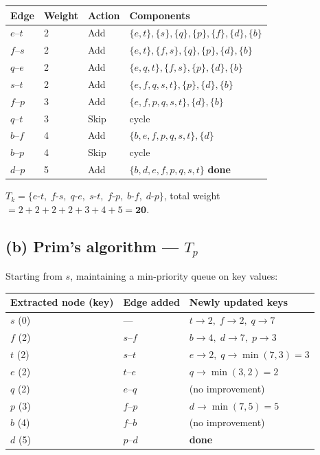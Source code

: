 \documentclass[11pt]{article}
\begin{document}
\begin{center}
\begin{tabular}{llll}
\toprule
Edge & Weight & Action & Components \\
\midrule
$e$--$t$ & 2 & Add & $\{e,t\},\{s\},\{q\},\{p\},\{f\},\{d\},\{b\}$ \\
$f$--$s$ & 2 & Add & $\{e,t\},\{f,s\},\{q\},\{p\},\{d\},\{b\}$ \\
$q$--$e$ & 2 & Add & $\{e,q,t\},\{f,s\},\{p\},\{d\},\{b\}$ \\
$s$--$t$ & 2 & Add & $\{e,f,q,s,t\},\{p\},\{d\},\{b\}$ \\
$f$--$p$ & 3 & Add & $\{e,f,p,q,s,t\},\{d\},\{b\}$ \\
$q$--$t$ & 3 & Skip & cycle \\
$b$--$f$ & 4 & Add & $\{b,e,f,p,q,s,t\},\{d\}$ \\
$b$--$p$ & 4 & Skip & cycle \\
$d$--$p$ & 5 & Add & $\{b,d,e,f,p,q,s,t\}$ \quad \textbf{done} \\
\bottomrule
\end{tabular}
\end{center}

$T_k = \{e\text{-}t,\; f\text{-}s,\; q\text{-}e,\; s\text{-}t,\; f\text{-}p,\; b\text{-}f,\; d\text{-}p\}$, \quad total weight $= 2+2+2+2+3+4+5 = \mathbf{20}$.

\subsection*{(b) Prim's algorithm --- $T_p$}

Starting from $s$, maintaining a min-priority queue on key values:

\begin{center}
\begin{tabular}{lll}
\toprule
Extracted node (key) & Edge added & Newly updated keys \\
\midrule
$s$ (0) & --- & $t{\to}2,\; f{\to}2,\; q{\to}7$ \\
$f$ (2) & $s$--$f$ & $b{\to}4,\; d{\to}7,\; p{\to}3$ \\
$t$ (2) & $s$--$t$ & $e{\to}2,\; q{\to}\min(7,3)=3$ \\
$e$ (2) & $t$--$e$ & $q{\to}\min(3,2)=2$ \\
$q$ (2) & $e$--$q$ & (no improvement) \\
$p$ (3) & $f$--$p$ & $d{\to}\min(7,5)=5$ \\
$b$ (4) & $f$--$b$ & (no improvement) \\
$d$ (5) & $p$--$d$ & \textbf{done} \\
\bottomrule
\end{tabular}
\end{center}
\end{document}
